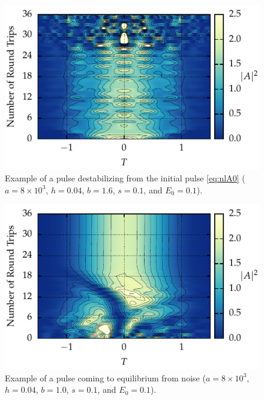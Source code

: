 \documentclass[9pt,twocolumn,twoside]{osajnl}
\begin{document}
\begin{figure}[tbp]
	\centering
	\includegraphics{Figures/Break}
	\caption{Example of a pulse destabilizing from the initial pulse \eqref{eq:nlA0} ($a = 8 \times 10^3$, $h = 0.04$, $b = 1.6$, $s = 0.1$, and $E_0 = 0.1$).}
	\label{fig:breakevo}
\end{figure}

\begin{figure}[tbp]
	\centering
	\includegraphics{Figures/Conv}
	\caption{Example of a pulse coming to equilibrium from noise ($a = 8 \times 10^3$, $h = 0.04$, $b = 1.0$, $s = 0.1$, and $E_0 = 0.1$).}
	\label{fig:convevo}
\end{figure}
\end{document}
